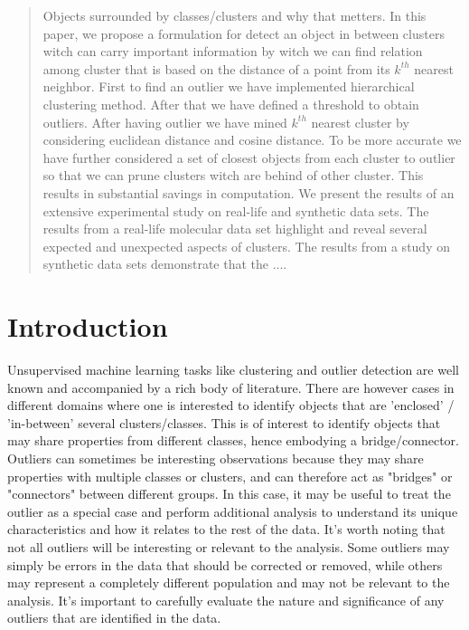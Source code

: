 \documentclass[11pt]{article}
\theoremstyle{definition}
\begin{document}
\newpage
\begin{abstract} 
\noindent Objects surrounded by classes/clusters and why that metters. In this paper, we propose a formulation for detect an object in between clusters witch can carry important information by witch we can find  relation among cluster that is based on the distance of a point from its $k^{th}$  nearest neighbor. First to find an outlier we have implemented hierarchical clustering method. After that we have defined a threshold to obtain outliers. After having outlier we have mined $k^{th}$ nearest cluster by considering euclidean distance and cosine distance. To be more accurate we have further considered a set of closest objects from each cluster to outlier so that we can prune clusters witch are behind of other cluster. This results in substantial savings in computation. We present the results of an extensive experimental study on real-life and synthetic data sets. The results from a real-life molecular data set highlight and reveal several expected and unexpected aspects of  clusters. The results from a study on synthetic data sets
demonstrate that the ....

\end{abstract}

\newpage

\tableofcontents

\newpage

\section{Introduction}
Unsupervised machine learning tasks like clustering and outlier detection are well known and accompanied by a rich body of literature. There are however cases in different domains where one is interested to identify objects that are 'enclosed' / 'in-between' several clusters/classes. This is of interest to identify objects that may share properties from different classes, hence embodying a bridge/connector.\\

 Outliers can sometimes be interesting observations because they may share properties with multiple classes or clusters, and can therefore act as "bridges" or "connectors" between different groups. In this case, it may be useful to treat the outlier as a special case and perform additional analysis to understand its unique characteristics and how it relates to the rest of the data. It's worth noting that not all outliers will be interesting or relevant to the analysis. Some outliers may simply be errors in the data that should be corrected or removed, while others may represent a completely different population and may not be relevant to the analysis. It's important to carefully evaluate the nature and significance of any outliers that are identified in the data.
\end{document}
